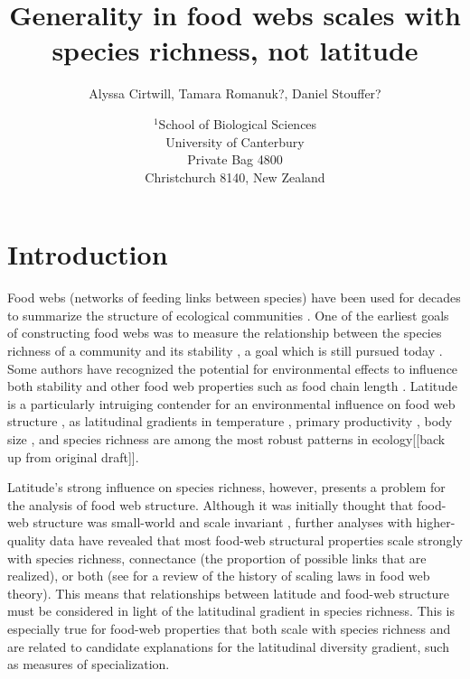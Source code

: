 \documentclass[12pt]{article}
\title{Generality in food webs scales with species richness, not latitude}
\author{Alyssa Cirtwill, Tamara Romanuk?, Daniel Stouffer?}
\date{$^1$School of Biological Sciences\\University of Canterbury\\
Private Bag 4800\\Christchurch 8140, New Zealand}
\begin{document}
\maketitle
\baselineskip=8.5mm
 
\vspace{0.4 in}


\section*{Introduction}

Food webs (networks of feeding links between species) have been used for decades to summarize the structure of 
ecological communities \citep{Williams2000,earlierwork}.
One of the earliest goals of constructing food webs was to measure the relationship between the species richness of
a community and its stability \citep{Dunne2006}, a goal which is still pursued today \citep{robustness studies}.
Some authors have recognized the potential for environmental effects to influence both stability \citep{Shurin2007} and 
other food web properties such as food chain length \citep{Townsend1998,Thompson2003,2004c,Young2013,Digel2014}.
Latitude is a particularly intruiging contender for an environmental influence on food web structure \citep{Shurin2007},
as latitudinal gradients in temperature \citep{}, primary productivity \citep{}, body size \citep{}, and 
species richness \citep{Schemske2009a} are among the most robust patterns in ecology[[back up from original draft]]. 


Latitude's strong influence on species richness, however, presents a problem for the analysis of food web structure.
Although it was initially thought that food-web structure was small-world and scale invariant \citep{}, further 
analyses with higher-quality data have revealed that most food-web structural properties scale strongly with species 
richness, connectance (the proportion of possible links that are realized), or both \citep{Riede2010} 
(see \citet{Dunne2006} for a review of the history of scaling laws in food web theory). This means that relationships
between latitude and food-web structure must be considered in light of the latitudinal gradient in species richness.
This is especially true for food-web properties that both scale with species richness and are related to candidate
explanations for the latitudinal diversity gradient, such as measures of specialization.
\end{document}
